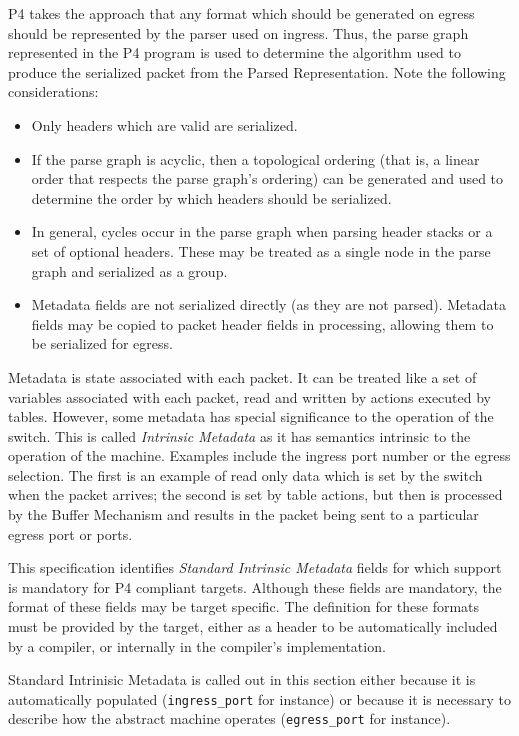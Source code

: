 \documentclass[12pt]{article}
\begin{document}
P4 takes the approach that any format which should be generated on egress
should be represented by the parser used on ingress.  Thus, the parse graph
represented in the P4 program is used to determine the algorithm used to produce
the serialized packet from the Parsed Representation.  Note the following
considerations:

\begin{itemize}
\item
Only headers which are valid are serialized.
\item
If the parse graph is acyclic, then a topological ordering (that is, a linear
order that respects the parse graph's ordering) can be generated and used
to determine the order by which headers should be serialized.
\item
In general, cycles occur in the parse graph when parsing header stacks or
a set of optional headers.  These may be treated as a single node in the parse
graph and serialized as a group.
\item
Metadata fields are not serialized directly (as they are not parsed).  Metadata
fields may be copied to packet header fields in \matchaction processing, allowing
them to be serialized for egress.
\end{itemize}



Metadata is state associated with each packet. It can be treated like a set
of variables associated with each packet, read and written by actions executed
by tables. However, some metadata has special significance to the operation
of the switch. This is called \textit{Intrinsic Metadata} as it has semantics intrinsic
to the operation of the machine. Examples include the ingress port number
or the egress selection. The first is an example of read only data which is
set by the switch when the packet arrives; the second is set by table actions,
but then is processed by the Buffer Mechanism and results in the packet being
sent to a particular egress port or ports.

This specification identifies \textit{Standard Intrinsic Metadata} fields for which
support is man\-datory for P4 compliant targets. Although these fields are mandatory,
the format of these fields may be target specific. The definition for these
formats must be provided by the target, either as a header to be automatically
included by a compiler, or internally in the compiler's implementation.

Standard Intrinisic Metadata is called out in this section either because
it is automatically populated (\texttt{ingress_port} for instance) or because it
is necessary to describe how the abstract machine operates (\texttt{egress_port} for
instance).
\end{document}
